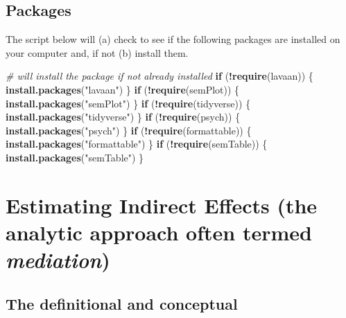 \documentclass[
  11pt,
]{book}
\newenvironment{Shaded}{\begin{snugshade}}{\end{snugshade}}
\newcommand{\CommentTok}[1]{\textcolor[rgb]{0.37,0.37,0.37}{\textit{#1}}}
\newcommand{\ControlFlowTok}[1]{\textcolor[rgb]{0.27,0.27,0.27}{\textbf{#1}}}
\newcommand{\FunctionTok}[1]{\textcolor[rgb]{0.27,0.27,0.27}{\textbf{#1}}}
\newcommand{\NormalTok}[1]{#1}
\newcommand{\SpecialCharTok}[1]{\textcolor[rgb]{0.43,0.43,0.43}{\textbf{#1}}}
\newcommand{\StringTok}[1]{\textcolor[rgb]{0.5,0.5,0.5}{#1}}
\begin{document}
\hypertarget{packages-4}{%
\subsection{Packages}\label{packages-4}}

The script below will (a) check to see if the following packages are installed on your computer and, if not (b) install them.

\begin{Shaded}
\begin{Highlighting}[]
\CommentTok{\# will install the package if not already installed}
\ControlFlowTok{if}\NormalTok{ (}\SpecialCharTok{!}\FunctionTok{require}\NormalTok{(lavaan)) \{}
    \FunctionTok{install.packages}\NormalTok{(}\StringTok{"lavaan"}\NormalTok{)}
\NormalTok{\}}
\ControlFlowTok{if}\NormalTok{ (}\SpecialCharTok{!}\FunctionTok{require}\NormalTok{(semPlot)) \{}
    \FunctionTok{install.packages}\NormalTok{(}\StringTok{"semPlot"}\NormalTok{)}
\NormalTok{\}}
\ControlFlowTok{if}\NormalTok{ (}\SpecialCharTok{!}\FunctionTok{require}\NormalTok{(tidyverse)) \{}
    \FunctionTok{install.packages}\NormalTok{(}\StringTok{"tidyverse"}\NormalTok{)}
\NormalTok{\}}
\ControlFlowTok{if}\NormalTok{ (}\SpecialCharTok{!}\FunctionTok{require}\NormalTok{(psych)) \{}
    \FunctionTok{install.packages}\NormalTok{(}\StringTok{"psych"}\NormalTok{)}
\NormalTok{\}}
\ControlFlowTok{if}\NormalTok{ (}\SpecialCharTok{!}\FunctionTok{require}\NormalTok{(formattable)) \{}
    \FunctionTok{install.packages}\NormalTok{(}\StringTok{"formattable"}\NormalTok{)}
\NormalTok{\}}
\ControlFlowTok{if}\NormalTok{ (}\SpecialCharTok{!}\FunctionTok{require}\NormalTok{(semTable)) \{}
    \FunctionTok{install.packages}\NormalTok{(}\StringTok{"semTable"}\NormalTok{)}
\NormalTok{\}}
\end{Highlighting}
\end{Shaded}

\hypertarget{estimating-indirect-effects-the-analytic-approach-often-termed-mediation}{%
\section{\texorpdfstring{Estimating Indirect Effects (the analytic approach often termed \emph{mediation})}{Estimating Indirect Effects (the analytic approach often termed mediation)}}\label{estimating-indirect-effects-the-analytic-approach-often-termed-mediation}}

\hypertarget{the-definitional-and-conceptual}{%
\subsection{The definitional and conceptual}\label{the-definitional-and-conceptual}}
\end{document}
